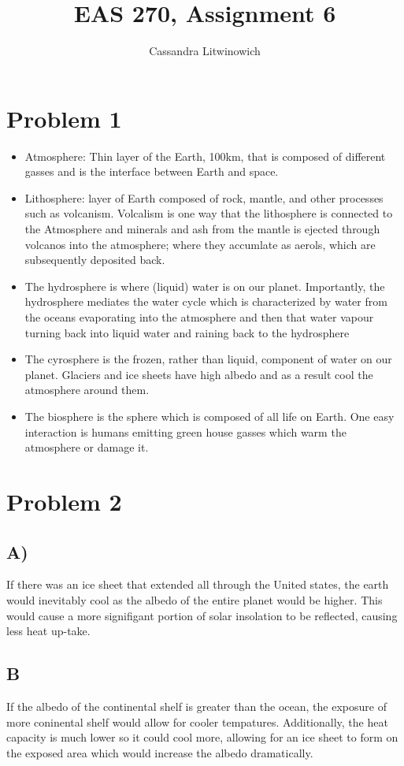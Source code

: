 \documentclass[12pt]{article}
\title{EAS 270, Assignment 6 }
\author{Cassandra Litwinowich}
\begin{document}
\maketitle

\section*{Problem 1}
\begin{itemize}
    \item Atmosphere: Thin layer of the Earth, 100km, that is composed of different gasses and is the interface between Earth and space.
    \item Lithosphere: layer of Earth composed of rock, mantle, and other processes such as volcanism. Volcalism is one way that the lithosphere is connected to the Atmosphere and minerals and ash from the mantle is ejected through volcanos into the atmosphere; where they accumlate as aerols, which are subsequently deposited back.
    \item The hydrosphere is where (liquid) water is on our planet.  Importantly, the hydrosphere mediates the water cycle which is characterized by water from the oceans evaporating into the atmosphere and then that water vapour turning back into liquid water and raining back to the hydrosphere
    \item The cyrosphere is the frozen, rather than liquid, component of water on our planet. Glaciers and ice sheets have high albedo and as a result cool the atmosphere around them.
    \item The biosphere is the sphere which is composed of all life on Earth. One easy interaction is humans emitting green house gasses which warm the atmosphere or damage it.
\end{itemize}
\section*{Problem 2}
\subsection*{A)}
If there was an ice sheet that extended all through the United states, the earth would inevitably cool as the albedo of the entire planet would be higher. This would cause a more signifigant portion of solar insolation to be reflected, causing less heat up-take.
\subsection*{B}
If the albedo of the continental shelf is greater than the ocean, the exposure of more coninental shelf would allow for cooler tempatures. Additionally, the heat capacity is much lower so it could cool more, allowing for an ice sheet to form on the exposed area which would increase the albedo dramatically.
\end{document}
